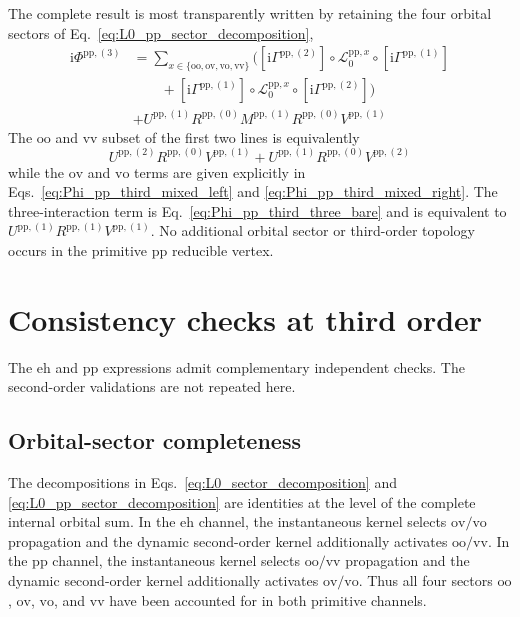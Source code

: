 \documentclass[aip,jcp,reprint,noshowkeys,superscriptaddress]{revtex4-1}
\newcommand{\ii}{\mathrm{i}}
\newcommand{\eh}{\text{eh}}
\newcommand{\pp}{\text{pp}}
\begin{document}
The complete result is most transparently written by retaining the four
orbital sectors of Eq.~\eqref{eq:L0_pp_sector_decomposition},
\begin{equation}
    \begin{split}
    \ii\Phi^{\pp,(3)}
    &=
    \sum_{x\in\{\text{oo},\text{ov},\text{vo},\text{vv}\}}
    \Big(
    \left[\ii\Gamma^{\pp,(2)}\right]
    \circ\mathcal L_0^{\pp,x}
    \circ\left[\ii\Gamma^{\pp,(1)}\right]
    \\
    &\qquad+
    \left[\ii\Gamma^{\pp,(1)}\right]
    \circ\mathcal L_0^{\pp,x}
    \circ\left[\ii\Gamma^{\pp,(2)}\right]
    \Big)
    \\
    &+
    U^{\pp,(1)}R^{\pp,(0)}M^{\pp,(1)}R^{\pp,(0)}V^{\pp,(1)}
    \end{split}
    \label{eq:Phi_pp_third_final}
\end{equation}
The $\text{oo}$ and $\text{vv}$ subset of the first two lines is equivalently
\begin{equation}
    U^{\pp,(2)}R^{\pp,(0)}V^{\pp,(1)}
    +
    U^{\pp,(1)}R^{\pp,(0)}V^{\pp,(2)}
    \label{eq:Phi_pp_third_oovv_resolvent}
\end{equation}
while the $\text{ov}$ and $\text{vo}$ terms are given explicitly in
Eqs.~\eqref{eq:Phi_pp_third_mixed_left} and
\eqref{eq:Phi_pp_third_mixed_right}.
The three-interaction term is Eq.~\eqref{eq:Phi_pp_third_three_bare} and is
equivalent to $U^{\pp,(1)}R^{\pp,(1)}V^{\pp,(1)}$.
No additional orbital sector or third-order topology occurs in the primitive
$\pp$ reducible vertex.

\section{Consistency checks at third order}
\label{sec:checks_third}

The $\eh$ and $\pp$ expressions admit complementary independent checks.
The second-order validations are not repeated here.

\subsection{Orbital-sector completeness}

The decompositions in Eqs.~\eqref{eq:L0_sector_decomposition} and
\eqref{eq:L0_pp_sector_decomposition} are identities at the level of the
complete internal orbital sum.
In the $\eh$ channel, the instantaneous kernel selects $\text{ov}/\text{vo}$ propagation
and the dynamic second-order kernel additionally activates $\text{oo}/\text{vv}$.
In the $\pp$ channel, the instantaneous kernel selects $\text{oo}/\text{vv}$ propagation
and the dynamic second-order kernel additionally activates $\text{ov}/\text{vo}$.
Thus all four sectors $\text{oo}$, $\text{ov}$, $\text{vo}$, and $\text{vv}$ have been accounted for in
both primitive channels.
\end{document}
